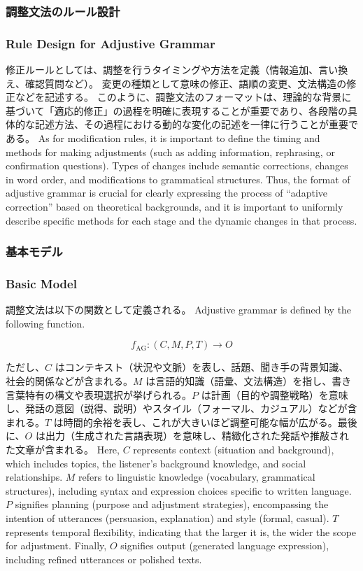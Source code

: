\documentclass[a4paper]{article}
\begin{document}
\ifJPN
\subsubsection{調整文法のルール設計}
\else
  \subsubsection{Rule Design for Adjustive Grammar}
\fi

\ifJPN
修正ルールとしては、調整を行うタイミングや方法を定義（情報追加、言い換え、確認質問など）。
変更の種類として意味の修正、語順の変更、文法構造の修正などを記述する。
このように、調整文法のフォーマットは、理論的な背景に基づいて「適応的修正」の過程を明確に表現することが重要であり、各段階の具体的な記述方法、その過程における動的な変化の記述を一律に行うことが重要である。
\else
As for modification rules, it is important to define the timing and methods for making adjustments (such as adding information, rephrasing, or confirmation questions).
Types of changes include semantic corrections, changes in word order, and modifications to grammatical structures.
Thus, the format of adjustive grammar is crucial for clearly expressing the process of ``adaptive correction'' based on theoretical backgrounds, and it is important to uniformly describe specific methods for each stage and the dynamic changes in that process.
\fi

\ifJPN
\subsubsection{基本モデル}
\else
  \subsubsection{Basic Model}
\fi

\ifJPN
調整文法は以下の関数として定義される。
\else
Adjustive grammar is defined by the following function.
\fi

\[
f_{\text{AG}} : (C, M, P, T) \to O
\]

\ifJPN
ただし、\( C \) はコンテキスト（状況や文脈）を表し、話題、聞き手の背景知識、社会的関係などが含まれる。\( M \) は言語的知識（語彙、文法構造）を指し、書き言葉特有の構文や表現選択が挙げられる。\( P \) は計画（目的や調整戦略）を意味し、発話の意図（説得、説明）やスタイル（フォーマル、カジュアル）などが含まれる。\( T \) は時間的余裕を表し、これが大きいほど調整可能な幅が広がる。最後に、\( O \) は出力（生成された言語表現）を意味し、精緻化された発話や推敲された文章が含まれる。
\else
Here, \( C \) represents context (situation and background), which includes topics, the listener's background knowledge, and social relationships. \( M \) refers to linguistic knowledge (vocabulary, grammatical structures), including syntax and expression choices specific to written language. \( P \) signifies planning (purpose and adjustment strategies), encompassing the intention of utterances (persuasion, explanation) and style (formal, casual). \( T \) represents temporal flexibility, indicating that the larger it is, the wider the scope for adjustment. Finally, \( O \) signifies output (generated language expression), including refined utterances or polished texts.
\fi
\end{document}
